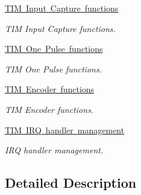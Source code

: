 \begin{DoxyCompactItemize}
\mbox{\hyperlink{group___t_i_m___exported___functions___group4}{T\+I\+M Input Capture functions}}
\begin{DoxyCompactList}\small\item\em T\+IM Input Capture functions. \end{DoxyCompactList}\item 
\mbox{\hyperlink{group___t_i_m___exported___functions___group5}{T\+I\+M One Pulse functions}}
\begin{DoxyCompactList}\small\item\em T\+IM One Pulse functions. \end{DoxyCompactList}\item 
\mbox{\hyperlink{group___t_i_m___exported___functions___group6}{T\+I\+M Encoder functions}}
\begin{DoxyCompactList}\small\item\em T\+IM Encoder functions. \end{DoxyCompactList}\item 
\mbox{\hyperlink{group___t_i_m___exported___functions___group7}{T\+I\+M I\+R\+Q handler management}}
\begin{DoxyCompactList}\small\item\em I\+RQ handler management. \end{DoxyCompactList}\end{DoxyCompactItemize}


\subsection{Detailed Description}
